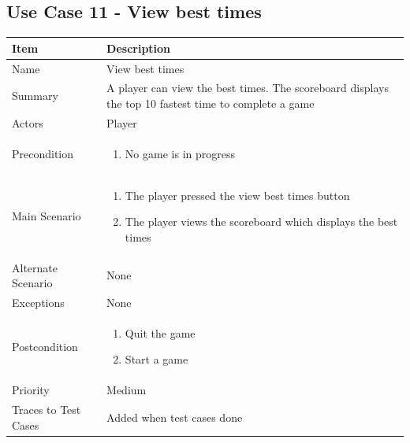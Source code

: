\documentclass[12pt]{article}
\begin{document}
\newpage


\subsection{Use Case 11 - View best times}

\begin{center}
\setlength{\tabcolsep}{18pt}
\renewcommand{\arraystretch}{1.3}
\begin{tabular}{ |p{3.4cm}|p{10cm}| }
    \hline
   \textbf{Item} & \textbf{Description} \\
    \hline
    Name & View best times \\
    \hline
    Summary & A player can view the best times. The scoreboard displays the top 10 fastest time to complete a game \\
    \hline
    Actors & Player \\
    \hline
    Precondition & 
    \vspace*{-0.1in}
    \begin{enumerate}
     
        \item No game is in progress
        
    \end{enumerate}  \\
    \hline
    Main Scenario & 
    \vspace*{-0.1in}
    \begin{enumerate}
        \item The player pressed the view best times button
        \item The player views the scoreboard which displays the best times
       
    \end{enumerate}  \\
    \hline
    Alternate Scenario & None \\
    \hline
    Exceptions & None \\
    \hline
    Postcondition & 
    \vspace*{-0.1in}
    \begin{enumerate}
        \item Quit the game
        \item Start a game
    \end{enumerate} \\
    \hline
    Priority & Medium \\
    \hline
    Traces to Test Cases & Added when test cases done  \\
    \hline
\end{tabular}
\end{center}
\end{document}
